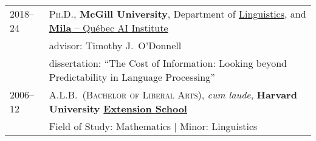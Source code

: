 \documentclass[11pt,a4paper]{article}
\begin{document}
\begin{longtable}{p{1.7cm}|p{15cm}}
  2018--24%
    &\textsc{Ph.D.},
     \textbf{McGill University},
     Department of \href{https://www.mcgill.ca/linguistics/graduate}{Linguistics}, and
     \href{https://mila.quebec}{\textbf{Mila} -- Québec AI Institute}\\
    &\quad{}advisor: Timothy J.\ O'Donnell\\
    &\quad{}dissertation: ``The Cost of Information: Looking beyond Predictability in Language Processing''\\
  2006--12%
    &\textsc{A.L.B.\ (Bachelor of Liberal Arts)}, \emph{cum laude},
     \textbf{Harvard University \href{https://extension.harvard.edu/}{Extension School}}\\
    &\quad{}Field of Study: Mathematics | Minor: Linguistics
  \end{longtable}
\end{document}
